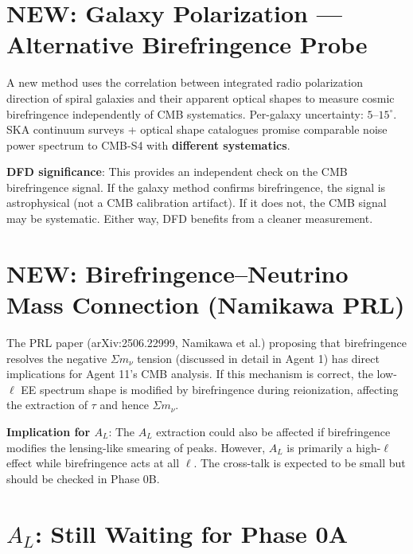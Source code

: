 \documentclass[11pt,a4paper]{article}
\newcommand{\NEW}{\textcolor{dfdblue}{\textbf{NEW}}}
\begin{document}
\section{\NEW: Galaxy Polarization --- Alternative Birefringence Probe}

\begin{tcolorbox}[colback=blue!5!white, colframe=blue!60!black,
  title={PRL 134, 161001 (2025): New Birefringence Probe Using Galaxy Polarization}]

A new method uses the correlation between integrated radio polarization direction of spiral galaxies and their apparent optical shapes to measure cosmic birefringence independently of CMB systematics. Per-galaxy uncertainty: $5$--$15^\circ$. SKA continuum surveys + optical shape catalogues promise comparable noise power spectrum to CMB-S4 with \textbf{different systematics}.

\textbf{DFD significance}: This provides an independent check on the CMB birefringence signal. If the galaxy method confirms birefringence, the signal is astrophysical (not a CMB calibration artifact). If it does not, the CMB signal may be systematic. Either way, DFD benefits from a cleaner measurement.
\end{tcolorbox}

\section{\NEW: Birefringence--Neutrino Mass Connection (Namikawa PRL)}

The PRL paper (arXiv:2506.22999, Namikawa et al.) proposing that birefringence resolves the negative $\Sigma m_\nu$ tension (discussed in detail in Agent 1) has direct implications for Agent 11's CMB analysis. If this mechanism is correct, the low-$\ell$ EE spectrum shape is modified by birefringence during reionization, affecting the extraction of $\tau$ and hence $\Sigma m_\nu$.

\textbf{Implication for $A_L$}: The $A_L$ extraction could also be affected if birefringence modifies the lensing-like smearing of peaks. However, $A_L$ is primarily a high-$\ell$ effect while birefringence acts at all $\ell$. The cross-talk is expected to be small but should be checked in Phase 0B.

\section{$A_L$: Still Waiting for Phase 0A}
\end{document}
